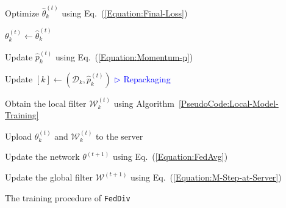 \documentclass[letterpaper]{article} %
\begin{document}
\begin{algorithm}[t]
\begin{algorithmic}[1]
{{{                \STATE Optimize $\hat{\theta}_{k}^{(t)}$ using  Eq.~(\textcolor{red}{\ref{Equation:Final-Loss}})\;

            }\ENDFOR

            \STATE $\theta_{k}^{(t)} \leftarrow \hat{\theta}_{k}^{(t)}$\;

            \STATE Update $\hat{p}_{k}^{(t)}$ using Eq.~(\textcolor{red}{\ref{Equation:Momentum-p}})\;

            \STATE Update $[k] \leftarrow (\mathcal{D}_{k}, \hat{p}_{k}^{(t)})$ \hfill{\textcolor{blue}{$\triangleright$  Repackaging}}

            \STATE Obtain the local filter $\mathcal{W}_{k}^{(t)}$ using Algorithm~\textcolor{red}{\ref{PseudoCode:Local-Model-Training}}\;

            \STATE Upload $\theta_{k}^{(t)}$ and $\mathcal{W}_{k}^{(t)}$ to the server\;

        }\ENDFOR

        \STATE Update the network ${\theta}^{(t+1)}$ using Eq.~(\textcolor{red}{\ref{Equation:FedAvg}})\;

        \ENDFOR

        \STATE Update the global filter ${\mathcal{W}}^{(t+1)}$ using Eq.~(\textcolor{red}{\ref{Equation:M-Step-at-Server}})\;

        }\ENDFOR

    \end{algorithmic}
    \caption{The training procedure of \texttt{FedDiv}}
    \label{PseudoCode:FedDiv}
\end{algorithm}
\end{document}
